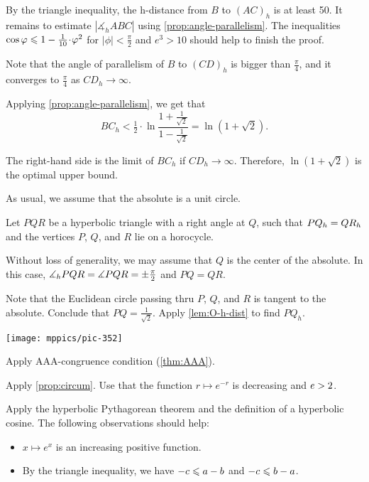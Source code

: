 \begin{multicols}{2}
By the triangle inequality, the h-distance from $B$ to $(AC)_h$ is at least 50.
It remains to estimate $|\measuredangle_h ABC|$ using \ref{prop:angle-parallelism}.
The inequalities $\cos\phi\z\le 1-\tfrac1{10}\cdot\phi^2$ for $|\phi|<\tfrac\pi2$ and $e^3>10$ should help to finish the proof.

Note that the angle of parallelism of $B$ to $(CD)_h$ is bigger than $\tfrac\pi4$,
and it converges to $\tfrac\pi4$ as $CD_h\to\infty$.

Applying \ref{prop:angle-parallelism},
we get that
$$BC_h<\tfrac12\cdot\ln\frac{1+\frac1{\sqrt{2}}}{1-\frac1{\sqrt{2}}}=\ln\left(1+\sqrt{2}\right).$$

The right-hand side is the limit of $BC_h$ if $CD_h\to\infty$.
Therefore, $\ln\left(1+\sqrt{2}\right)$ is the optimal upper bound.

As usual, we assume that the absolute is a unit circle.

Let $PQR$ be a hyperbolic triangle
with a right angle at $Q$, such that $PQ_h\z=QR_h$
and the vertices $P$, $Q$, and $R$ 
lie on a horocycle.

Without loss of generality, we may assume that $Q$ is the center of the absolute.
In this case, $\measuredangle_hPQR\z=\measuredangle PQR\z=\pm\tfrac\pi2$ and $PQ=QR$.

Note that the Euclidean circle passing thru $P$, $Q$, and $R$ is tangent to the absolute.
Conclude that $PQ=\tfrac1{\sqrt2}$. 
Apply \ref{lem:O-h-dist} to find $PQ_h$.

\begin{Figure}
\vskip-0mm
\centering
\texttt{[image: mppics/pic-352]}
\end{Figure}


Apply AAA-congruence condition (\ref{thm:AAA}).

Apply \ref{prop:circum}.
Use that the function $r\mapsto e^{-r}$ is decreasing and $e\z>2$.

Apply the hyperbolic Pythagorean theorem and the definition of a hyperbolic cosine.
The following observations should help:
\begin{itemize}
 \item $x\mapsto e^x$ is an increasing positive function.
 \item By the triangle inequality,  we have $-c\z\le a-b$ and $-c\z\le b-a$.
\end{itemize}


\end{multicols}
